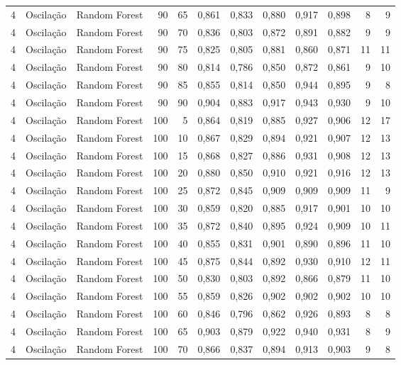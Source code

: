 \begin{longtable}{@{}rllrrrrrrrrr@{}}
4 & Oscilação & Random Forest & 90 & 65 & 0,861 & 0,833 & 0,880 & 0,917 & 0,898 & 8 & 9 \\
4 & Oscilação & Random Forest & 90 & 70 & 0,836 & 0,803 & 0,872 & 0,891 & 0,882 & 9 & 9 \\
4 & Oscilação & Random Forest & 90 & 75 & 0,825 & 0,805 & 0,881 & 0,860 & 0,871 & 11 & 11 \\
4 & Oscilação & Random Forest & 90 & 80 & 0,814 & 0,786 & 0,850 & 0,872 & 0,861 & 9 & 10 \\
4 & Oscilação & Random Forest & 90 & 85 & 0,855 & 0,814 & 0,850 & 0,944 & 0,895 & 9 & 8 \\
4 & Oscilação & Random Forest & 90 & 90 & 0,904 & 0,883 & 0,917 & 0,943 & 0,930 & 9 & 10 \\
4 & Oscilação & Random Forest & 100 & 5 & 0,864 & 0,819 & 0,885 & 0,927 & 0,906 & 12 & 17 \\
4 & Oscilação & Random Forest & 100 & 10 & 0,867 & 0,829 & 0,894 & 0,921 & 0,907 & 12 & 13 \\
4 & Oscilação & Random Forest & 100 & 15 & 0,868 & 0,827 & 0,886 & 0,931 & 0,908 & 12 & 13 \\
4 & Oscilação & Random Forest & 100 & 20 & 0,880 & 0,850 & 0,910 & 0,921 & 0,916 & 12 & 13 \\
4 & Oscilação & Random Forest & 100 & 25 & 0,872 & 0,845 & 0,909 & 0,909 & 0,909 & 11 & 9 \\
4 & Oscilação & Random Forest & 100 & 30 & 0,859 & 0,820 & 0,885 & 0,917 & 0,901 & 10 & 10 \\
4 & Oscilação & Random Forest & 100 & 35 & 0,872 & 0,840 & 0,895 & 0,924 & 0,909 & 10 & 11 \\
4 & Oscilação & Random Forest & 100 & 40 & 0,855 & 0,831 & 0,901 & 0,890 & 0,896 & 11 & 10 \\
4 & Oscilação & Random Forest & 100 & 45 & 0,875 & 0,844 & 0,892 & 0,930 & 0,910 & 12 & 11 \\
4 & Oscilação & Random Forest & 100 & 50 & 0,830 & 0,803 & 0,892 & 0,866 & 0,879 & 11 & 10 \\
4 & Oscilação & Random Forest & 100 & 55 & 0,859 & 0,826 & 0,902 & 0,902 & 0,902 & 10 & 10 \\
4 & Oscilação & Random Forest & 100 & 60 & 0,846 & 0,796 & 0,862 & 0,926 & 0,893 & 8 & 8 \\
4 & Oscilação & Random Forest & 100 & 65 & 0,903 & 0,879 & 0,922 & 0,940 & 0,931 & 8 & 9 \\
4 & Oscilação & Random Forest & 100 & 70 & 0,866 & 0,837 & 0,894 & 0,913 & 0,903 & 9 & 8 \\

\end{longtable}
